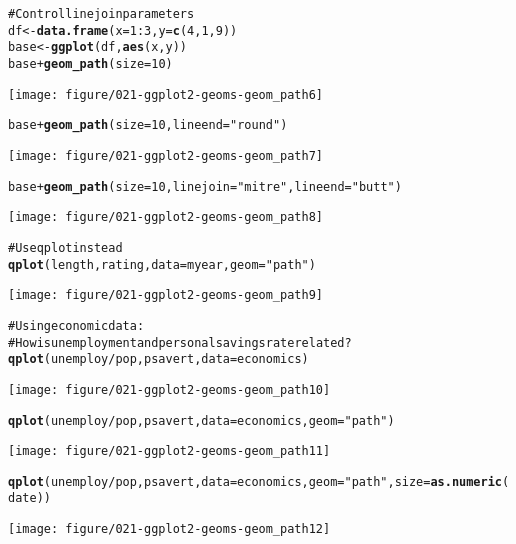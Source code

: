 \documentclass[a4paper,titlepage]{tufte-handout}\usepackage{graphicx, color}
\makeatletter
\def\maxwidth{ %
  \ifdim\Gin@nat@width>\linewidth
    \linewidth
  \else
    \Gin@nat@width
  \fi
}
\newcommand{\hlfunctioncall}[1]{\textcolor[rgb]{0.501960784313725,0,0.329411764705882}{\textbf{#1}}}%
\newcommand{\hlstring}[1]{\textcolor[rgb]{0.6,0.6,1}{#1}}%
\newcommand{\hlcomment}[1]{\textcolor[rgb]{0.180392156862745,0.6,0.341176470588235}{#1}}%
\newenvironment{kframe}{%
 \def\at@end@of@kframe{}%
 \ifinner\ifhmode%
  \def\at@end@of@kframe{\end{minipage}}%
  \begin{minipage}{\columnwidth}%
 \fi\fi%
 \def\FrameCommand##1{\hskip\@totalleftmargin \hskip-\fboxsep
 \colorbox{shadecolor}{##1}\hskip-\fboxsep
     \hskip-\linewidth \hskip-\@totalleftmargin \hskip\columnwidth}%
 \MakeFramed {\advance\hsize-\width
   \@totalleftmargin\z@ \linewidth\hsize
   \@setminipage}}%
 {\par\unskip\endMakeFramed%
 \at@end@of@kframe}
\newenvironment{knitrout}{}{} %
\makeatother
\begin{document}
\begin{knitrout}
\begin{kframe}
\begin{alltt}
\hlcomment{# Control line join parameters}
df <- \hlfunctioncall{data.frame}(x = 1:3, y = \hlfunctioncall{c}(4, 1, 9))
base <- \hlfunctioncall{ggplot}(df, \hlfunctioncall{aes}(x, y))
base + \hlfunctioncall{geom_path}(size = 10)
\end{alltt}
\end{kframe}
\texttt{[image: figure/021-ggplot2-geoms-geom\_path6]} 
\begin{kframe}\begin{alltt}
base + \hlfunctioncall{geom_path}(size = 10, lineend = \hlstring{"round"})
\end{alltt}
\end{kframe}
\texttt{[image: figure/021-ggplot2-geoms-geom\_path7]} 
\begin{kframe}\begin{alltt}
base + \hlfunctioncall{geom_path}(size = 10, linejoin = \hlstring{"mitre"}, lineend = \hlstring{"butt"})
\end{alltt}
\end{kframe}
\texttt{[image: figure/021-ggplot2-geoms-geom\_path8]} 
\begin{kframe}\begin{alltt}

\hlcomment{# Use qplot instead}
\hlfunctioncall{qplot}(length, rating, data=myear, geom=\hlstring{"path"})
\end{alltt}
\end{kframe}
\texttt{[image: figure/021-ggplot2-geoms-geom\_path9]} 
\begin{kframe}\begin{alltt}

\hlcomment{# Using economic data:}
\hlcomment{# How is unemployment and personal savings rate related?}
\hlfunctioncall{qplot}(unemploy/pop, psavert, data=economics)
\end{alltt}
\end{kframe}
\texttt{[image: figure/021-ggplot2-geoms-geom\_path10]} 
\begin{kframe}\begin{alltt}
\hlfunctioncall{qplot}(unemploy/pop, psavert, data=economics, geom=\hlstring{"path"})
\end{alltt}
\end{kframe}
\texttt{[image: figure/021-ggplot2-geoms-geom\_path11]} 
\begin{kframe}\begin{alltt}
\hlfunctioncall{qplot}(unemploy/pop, psavert, data=economics, geom=\hlstring{"path"}, size=\hlfunctioncall{as.numeric}(date))
\end{alltt}
\end{kframe}
\texttt{[image: figure/021-ggplot2-geoms-geom\_path12]} 
\begin{kframe}\begin{alltt}


\end{alltt}
\end{kframe}
\end{knitrout}
\end{document}
